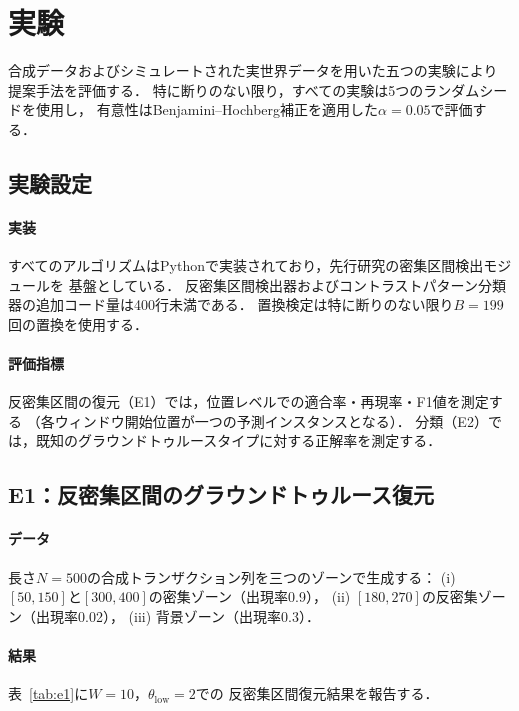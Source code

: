 \section{実験}\label{sec:experiments}

合成データおよびシミュレートされた実世界データを用いた五つの実験により
提案手法を評価する．
特に断りのない限り，すべての実験は5つのランダムシードを使用し，
有意性はBenjamini--Hochberg補正を適用した$\alpha = 0.05$で評価する．

\subsection{実験設定}

\paragraph{実装}
すべてのアルゴリズムはPythonで実装されており，先行研究の密集区間検出モジュールを
基盤としている．
反密集区間検出器およびコントラストパターン分類器の追加コード量は400行未満である．
置換検定は特に断りのない限り$B = 199$回の置換を使用する．

\paragraph{評価指標}
反密集区間の復元（E1）では，位置レベルでの適合率・再現率・F1値を測定する
（各ウィンドウ開始位置が一つの予測インスタンスとなる）．
分類（E2）では，既知のグラウンドトゥルースタイプに対する正解率を測定する．

\subsection{E1：反密集区間のグラウンドトゥルース復元}

\paragraph{データ}
長さ$N = 500$の合成トランザクション列を三つのゾーンで生成する：
(i) $[50, 150]$と$[300, 400]$の密集ゾーン（出現率0.9），
(ii) $[180, 270]$の反密集ゾーン（出現率0.02），
(iii) 背景ゾーン（出現率0.3）．

\paragraph{結果}
表~\ref{tab:e1}に$W = 10$，$\theta_{\text{low}} = 2$での
反密集区間復元結果を報告する．

